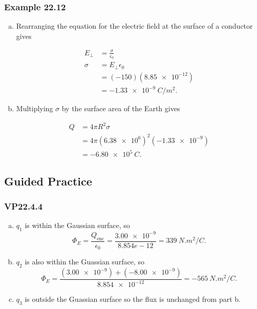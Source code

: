 \documentclass{article}
\begin{document}
\subsubsection{Example 22.12}

\begin{enumerate}[a)]
  \item Rearranging the equation for the electric field at the surface of a conductor gives

        \begin{align*}
          E_\perp & = \frac{\sigma}{\epsilon_0} \\
          \sigma  & = E_\perp \epsilon_0        \\
                  & = (-150) (\num{8.85e-12})   \\
                  & = -\qty{1.33e-9}{C/m^2}.
        \end{align*}

  \item Multiplying $\sigma$ by the surface area of the Earth gives

        \begin{align*}
          Q & = 4 \pi R^2 \sigma                        \\
            & = 4 \pi (\num{6.38e6})^2 (\qty{-1.33e-9}) \\
            & = \qty{-6.80e5}{C}.
        \end{align*}
\end{enumerate}

\subsection{Guided Practice}

\subsubsection{VP22.4.4}

\begin{enumerate}[a)]
  \item $q_1$ is within the Gaussian surface, so \[\Phi_E = \frac{Q_\textrm{enc}}{\epsilon_0} = \frac{\num{3.00e-9}}{8.854e-12} = \qty{339}{N.m^2/C}.\]

  \item $q_2$ is also within the Guassian surface, so \[\Phi_E = \frac{(\num{3.00e-9}) + (\num{-8.00e-9})}{\num{8.854e-12}} = \qty{-565}{N.m^2/C}.\]

  \item $q_3$ is outside the Guassian surface so the flux is unchanged from part b.
\end{enumerate}
\end{document}
